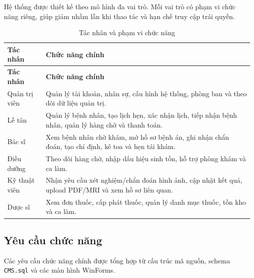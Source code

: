 \documentclass[12pt,a4paper]{article}
\numberwithin{figure}{subsection}
\numberwithin{table}{subsection}
\begin{document}
Hệ thống được thiết kế theo mô hình đa vai trò. Mỗi vai trò có phạm vi chức năng riêng, giúp giảm nhầm lẫn khi thao tác và hạn chế truy cập trái quyền.

\begin{longtable}{|p{3.4cm}|p{10.4cm}|}
\caption{Tác nhân và phạm vi chức năng} \\
\hline
\textbf{Tác nhân} & \textbf{Chức năng chính} \\
\hline
\endfirsthead
\hline
\textbf{Tác nhân} & \textbf{Chức năng chính} \\
\hline
\endhead
Quản trị viên & Quản lý tài khoản, nhân sự, cấu hình hệ thống, phòng ban và theo dõi dữ liệu quản trị. \\
\hline
Lễ tân & Quản lý bệnh nhân, tạo lịch hẹn, xác nhận lịch, tiếp nhận bệnh nhân, quản lý hàng chờ và thanh toán. \\
\hline
Bác sĩ & Xem bệnh nhân chờ khám, mở hồ sơ bệnh án, ghi nhận chẩn đoán, tạo chỉ định, kê toa và hẹn tái khám. \\
\hline
Điều dưỡng & Theo dõi hàng chờ, nhập dấu hiệu sinh tồn, hỗ trợ phòng khám và ca làm. \\
\hline
Kỹ thuật viên & Nhận yêu cầu xét nghiệm/chẩn đoán hình ảnh, cập nhật kết quả, upload PDF/MRI và xem hồ sơ liên quan. \\
\hline
Dược sĩ & Xem đơn thuốc, cấp phát thuốc, quản lý danh mục thuốc, tồn kho và ca làm. \\
\hline
\end{longtable}

\subsection{Yêu cầu chức năng}

Các yêu cầu chức năng chính được tổng hợp từ cấu trúc mã nguồn, schema \texttt{CMS.sql} và các màn hình WinForms.
\end{document}
